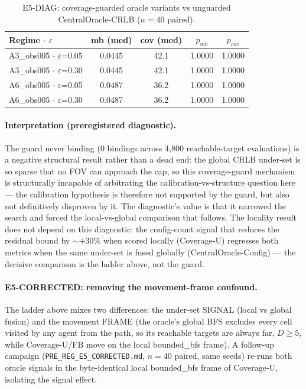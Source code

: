 \documentclass[journal]{IEEEtran}
\newcommand{\CU}{Coverage-U}
\begin{document}
\begin{table}[t]
\caption{E5-DIAG: coverage-guarded oracle variants vs unguarded CentralOracle-CRLB ($n = 40$ paired).}
\label{tab:e5diag}
\centering
\begin{tabular}{l c c c c}
\toprule
Regime $\cdot$ $\varepsilon$ & mb (med) & cov (med) & $p_{mb}$ & $p_{cov}$ \\
\midrule
A3\_obs005  $\cdot$  $\varepsilon$=0.05 & 0.0445 & 42.1 & 1.0000 & 1.0000 \\
A3\_obs005  $\cdot$  $\varepsilon$=0.30 & 0.0445 & 42.1 & 1.0000 & 1.0000 \\
A6\_obs005  $\cdot$  $\varepsilon$=0.05 & 0.0487 & 36.2 & 1.0000 & 1.0000 \\
A6\_obs005  $\cdot$  $\varepsilon$=0.30 & 0.0487 & 36.2 & 1.0000 & 1.0000 \\
\bottomrule
\end{tabular}
\end{table}


\paragraph{Interpretation (preregistered diagnostic).}
The guard never binding (0 bindings across 4{,}800 reachable-target
evaluations) is a negative structural result rather than a dead end: the global
CRLB under-set is so sparse that no FOV can approach the cap, so this
coverage-guard mechanism is structurally incapable of arbitrating the
calibration-vs-structure question here --- the calibration hypothesis is
therefore not supported by the guard, but also not definitively disproven by
it. The diagnostic's value is that it narrowed the search and forced the
local-vs-global comparison that follows. The locality result does not depend on
this diagnostic: the config-count signal that reduces the residual bound by
$\sim$+30\% when scored locally (\CU) regresses both metrics when the same
under-set is fused globally (CentralOracle-Config) --- the decisive comparison
is the ladder above, not the guard.

\paragraph{E5-CORRECTED: removing the movement-frame confound.}
The ladder above mixes two differences: the under-set SIGNAL (local vs global
fusion) and the movement FRAME (the oracle's global BFS excludes every cell
visited by any agent from the path, so its reachable targets are always far,
$D \geq 5$, while \CU/FB move on the local bounded\_bfs frame). A follow-up
campaign (\texttt{PRE\_REG\_E5\_CORRECTED.md}, $n = 40$ paired, same seeds)
re-runs both oracle signals in the byte-identical local bounded\_bfs frame of
\CU, isolating the signal effect.
\end{document}
